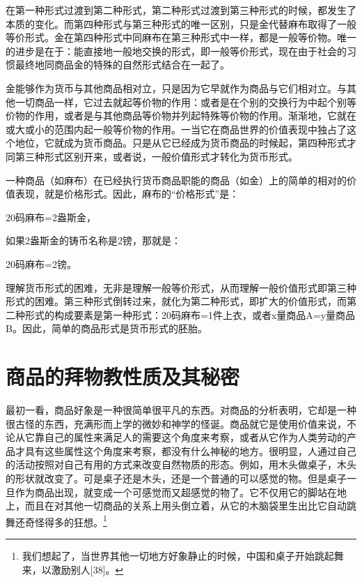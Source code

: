 \documentclass{ctexbook}
\begin{document}
        在第一种形式过渡到第二种形式，第二种形式过渡到第三种形式的时候，都发生了本质的变化。而第四种形式与第三种形式的唯一区别，只是金代替麻布取得了一般等价形式。金在第四种形式中同麻布在第三种形式中一样，都是一般等价物。唯一的进步是在于：能直接地一般地交换的形式，即一般等价形式，现在由于社会的习惯最终地同商品金的特殊的自然形式结合在一起了。
        
        金能够作为货币与其他商品相对立，只是因为它早就作为商品与它们相对立。与其他一切商品一样，它过去就起等价物的作用：或者是在个别的交换行为中起个别等价物的作用，或者是与其他商品等价物并列起特殊等价物的作用。渐渐地，它就在或大或小的范围内起一般等价物的作用。一当它在商品世界的价值表现中独占了这个地位，它就成为货币商品。只是从它已经成为货币商品的时候起，第四种形式才同第三种形式区别开来，或者说，一般价值形式才转化为货币形式。
        
        一种商品（如麻布）在已经执行货币商品职能的商品（如金）上的简单的相对的价值表现，就是价格形式。因此，麻布的“价格形式”是：
        \centerline{20码麻布=2盎斯金，}
        如果2盎斯金的铸币名称是2镑，那就是：

        \centerline{20码麻布=2镑。}
        
        理解货币形式的困难，无非是理解一般等价形式，从而理解一般价值形式即第三种形式的困难。第三种形式倒转过来，就化为第二种形式，即扩大的价值形式，而第二种形式的构成要素是第一种形式：20码麻布=1件上衣，或者x量商品A=y量商品B。因此，简单的商品形式是货币形式的胚胎。

    \section{商品的拜物教性质及其秘密}

    最初一看，商品好象是一种很简单很平凡的东西。对商品的分析表明，它却是一种很古怪的东西，充满形而上学的微妙和神学的怪诞。商品就它是使用价值来说，不论从它靠自己的属性来满足人的需要这个角度来考察，或者从它作为人类劳动的产品才具有这些属性这个角度来考察，都没有什么神秘的地方。很明显，人通过自己的活动按照对自己有用的方式来改变自然物质的形态。例如，用木头做桌子，木头的形状就改变了。可是桌子还是木头，还是一个普通的可以感觉的物。但是桌子一旦作为商品出现，就变成一个可感觉而又超感觉的物了。它不仅用它的脚站在地上，而且在对其他一切商品的关系上用头倒立着，从它的木脑袋里生出比它自动跳舞还奇怪得多的狂想。\footnote{我们想起了，当世界其他一切地方好象静止的时候，中国和桌子开始跳起舞来，以激励别人[38]。}
    
\end{document}
